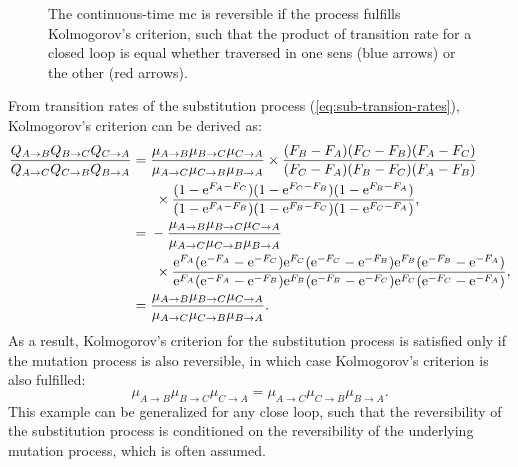 \begin{figure}[htb!]
    \centering
    \caption[Kolmogorov's criterion]{
    The continuous-time \gls{mc} is reversible if the process fulfills Kolmogorov's criterion, such that the product of {transition} rate for a closed loop is equal whether traversed in one sens (blue arrows) or the other (red arrows).}
    \label{fig:reversible-circuit}%
\end{figure}

From {transition} rates of the \gls{substitution} process (\ref{eq:sub-transion-rates}), Kolmogorov's criterion can be derived as:
\begin{align}
    \dfrac{Q_{A \to B}Q_{B \to C}Q_{C \to A}}{Q_{A \to C}Q_{C \to B}Q_{B \to A}}
    ={}& \dfrac{\mu_{A \to B}\mu_{B \to C}\mu_{C \to A}}{\mu_{A \to C}\mu_{C \to B}\mu_{B \to A}}
    \times \dfrac{(F_{B} - F_{A})(F_{C} - F_{B})(F_{A} - F_{C})}{(F_{C} - F_{A})(F_{B} - F_{C})(F_{A} - F_{B})} \notag \\
    &\ \times \dfrac{( 1 - \mathrm{e}^{F_{A} - F_{C}} )( 1 - \mathrm{e}^{F_{C} - F_{B}} )( 1 - \mathrm{e}^{F_{B} - F_{A}} )}{( 1 - \mathrm{e}^{F_{A} - F_{B}} )( 1 - \mathrm{e}^{F_{B} - F_{C}} )( 1 - \mathrm{e}^{F_{C} - F_{A}} )}, \\
    ={}& - \dfrac{\mu_{A \to B}\mu_{B \to C}\mu_{C \to A}}{\mu_{A \to C}\mu_{C \to B}\mu_{B \to A}} \notag \\
    &\ \times \dfrac{\mathrm{e}^{F_{A}}( \mathrm{e}^{-F_{A}} - \mathrm{e}^{ - F_{C}} )\mathrm{e}^{F_{C}}( \mathrm{e}^{-F_{C}} - \mathrm{e}^{ - F_{B}} )\mathrm{e}^{F_{B}}( \mathrm{e}^{-F_{B}} - \mathrm{e}^{ - F_{A}} )}{\mathrm{e}^{F_{A}}( \mathrm{e}^{-F_{A}} - \mathrm{e}^{ - F_{B}} )\mathrm{e}^{F_{B}}( \mathrm{e}^{-F_{B}} - \mathrm{e}^{ - F_{C}} )\mathrm{e}^{F_{C}}( \mathrm{e}^{-F_{C}} - \mathrm{e}^{ - F_{A}} )}, \\
    ={}& \dfrac{\mu_{A \to B}\mu_{B \to C}\mu_{C \to A}}{\mu_{A \to C}\mu_{C \to B}\mu_{B \to A}}.
\end{align}
As a result, Kolmogorov's criterion for the \gls{substitution} process is satisfied only if the mutation process is also reversible, in which case Kolmogorov's criterion is also fulfilled:
\begin{equation}
    \mu_{A \to B}\mu_{B \to C}\mu_{C \to A}=\mu_{A \to C}\mu_{C \to B}\mu_{B \to A}.
\end{equation}
This example can be generalized for any close loop, such that the reversibility of the \gls{substitution} process is conditioned on the reversibility of the underlying mutation process, which is often assumed.

